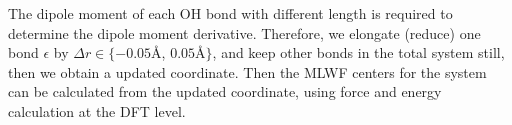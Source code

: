 %        
%
The dipole moment of each OH bond with different length is required to determine the dipole moment derivative. 
Therefore, we elongate (reduce) one bond ${\epsilon}$ by $\Delta r \in \{-0.05 $\AA, $0.05 $\AA $\}$, and keep other 
bonds in the total system still, then we obtain a updated coordinate.
Then the MLWF centers for the system can be calculated from the updated coordinate, using force and energy calculation at the DFT level.
